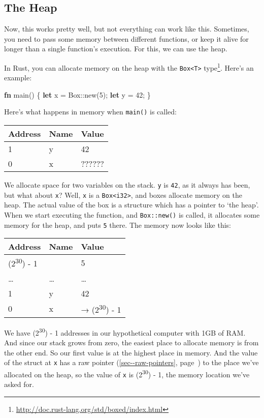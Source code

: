 \documentclass[a4paper,]{book}
\renewcommand*{\hypertarget}[3][\ar]{%
  \def\ar{#2}%
  \label{#1}%
  #3}
\renewcommand*{\hyperlink}[2]{%
 #2 (\autoref{#1}, page~\pageref{#1})}
\newenvironment{Shaded}{\begin{snugshade}}{\end{snugshade}}
\newcommand{\KeywordTok}[1]{\textcolor[rgb]{0.13,0.29,0.53}{\textbf{{#1}}}}
\newcommand{\DataTypeTok}[1]{\textcolor[rgb]{0.13,0.29,0.53}{{#1}}}
\newcommand{\DecValTok}[1]{\textcolor[rgb]{0.00,0.00,0.81}{{#1}}}
\newcommand{\NormalTok}[1]{{#1}}
\renewcommand{\href}[2]{#2\footnote{\url{#1}}}
\begin{document}
\hypertarget{the-heap}{\subsection{The Heap}\label{the-heap}}

Now, this works pretty well, but not everything can work like this.
Sometimes, you need to pass some memory between different functions, or
keep it alive for longer than a single function's execution. For this,
we can use the heap.

In Rust, you can allocate memory on the heap with the
\href{http://doc.rust-lang.org/std/boxed/index.html}{\texttt{Box\textless{}T\textgreater{}}
type}. Here's an example:

\begin{Shaded}
\begin{Highlighting}[]
\KeywordTok{fn} \NormalTok{main() \{}
    \KeywordTok{let} \NormalTok{x = }\DataTypeTok{Box}\NormalTok{::new(}\DecValTok{5}\NormalTok{);}
    \KeywordTok{let} \NormalTok{y = }\DecValTok{42}\NormalTok{;}
\NormalTok{\}}
\end{Highlighting}
\end{Shaded}

Here's what happens in memory when \texttt{main()} is called:

\begin{longtable}[]{@{}lll@{}}
\toprule
Address & Name & Value\tabularnewline
\midrule
\endhead
1 & y & 42\tabularnewline
0 & x & ??????\tabularnewline
\bottomrule
\end{longtable}

We allocate space for two variables on the stack. \texttt{y} is
\texttt{42}, as it always has been, but what about \texttt{x}? Well,
\texttt{x} is a \texttt{Box\textless{}i32\textgreater{}}, and boxes
allocate memory on the heap. The actual value of the box is a structure
which has a pointer to `the heap'. When we start executing the function,
and \texttt{Box::new()} is called, it allocates some memory for the
heap, and puts \texttt{5} there. The memory now looks like this:

\begin{longtable}[]{@{}lll@{}}
\toprule
Address & Name & Value\tabularnewline
\midrule
\endhead
(2\textsuperscript{30}) - 1 & & 5\tabularnewline
\ldots{} & \ldots{} & \ldots{}\tabularnewline
1 & y & 42\tabularnewline
0 & x & → (2\textsuperscript{30}) - 1\tabularnewline
\bottomrule
\end{longtable}

We have (2\textsuperscript{30}) - 1 addresses in our hypothetical
computer with 1GB of RAM. And since our stack grows from zero, the
easiest place to allocate memory is from the other end. So our first
value is at the highest place in memory. And the value of the struct at
\texttt{x} has a \protect\hyperlink{sec--raw-pointers}{raw pointer} to
the place we've allocated on the heap, so the value of \texttt{x} is
(2\textsuperscript{30}) - 1, the memory location we've asked for.
\end{document}
